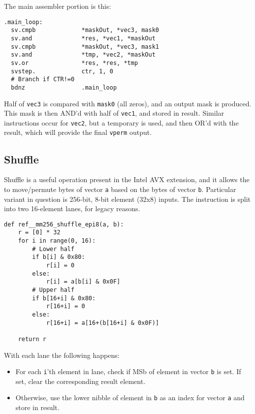 The main assembler portion is this:
\begin{verbatim}
.main_loop:
  sv.cmpb             *maskOut, *vec3, mask0
  sv.and              *res, *vec1, *maskOut
  sv.cmpb             *maskOut, *vec3, mask1
  sv.and              *tmp, *vec2, *maskOut
  sv.or               *res, *res, *tmp
  svstep.             ctr, 1, 0
  # Branch if CTR!=0
  bdnz                .main_loop
\end{verbatim}

Half of \texttt{vec3} is compared with \texttt{mask0} (all zeros), and an output
mask is produced. This mask is then AND'd with half of \texttt{vec1}, and stored
in result.
Similar instructions occur for \texttt{vec2}, but a temporary is used, and then
OR'd with the result, which will provide the final \texttt{vperm} output.

\subsection{Shuffle}

Shuffle is a useful operation present in the Intel \acrshort{AVX} extension,
and it allows the to move/permute bytes of vector \texttt{a} based on the
bytes of vector \texttt{b}.
Particular variant in question is 256-bit, 8-bit element (32x8) inputs.
The instruction is split into two 16-element lanes, for legacy reasons.

\begin{verbatim}
def ref__mm256_shuffle_epi8(a, b):
    r = [0] * 32
    for i in range(0, 16):
        # Lower half
        if b[i] & 0x80:
            r[i] = 0
        else:
            r[i] = a[b[i] & 0x0F]
        # Upper half
        if b[16+i] & 0x80:
            r[16+i] = 0
        else:
            r[16+i] = a[16+(b[16+i] & 0x0F)]

    return r
\end{verbatim}

With each lane the following happens:

\begin{itemize}
  \item For each \texttt{i}'th element in lane, check if \acrfull{MSb} of
        element in vector \texttt{b} is set. If set, clear the corresponding
        result element.
  \item Otherwise, use the lower nibble of element in \texttt{b} as an index
        for vector \texttt{a} and store in result.
\end{itemize}

